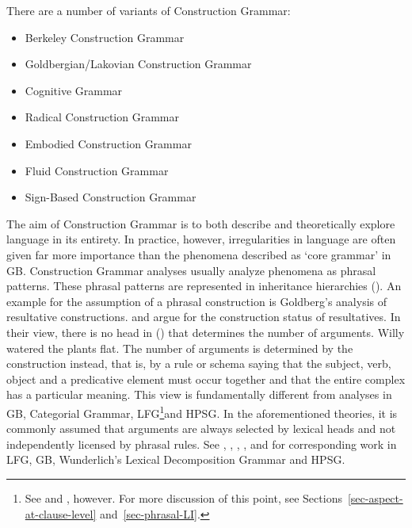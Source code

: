 There are a number of variants of Construction Grammar:
\begin{sloppypar}
\begin{itemize}
\item Berkeley Construction Grammar \citep{Fillmore88a,KF99a,FriedHSK}
\item Goldbergian/Lakovian Construction Grammar \citep{Lakoff87a-u,Goldberg95a,Goldberg2006a}
\item Cognitive Grammar \citep{Langacker87a-u,Langacker2000a,Langacker2008a-u,Dabrowska2004a}
\item Radical Construction Grammar \citep{Croft2001a}
\item Embodied Construction Grammar \citep{BC2005a}
\item Fluid Construction Grammar \citep{SDB2006a-u,SteelsFluid-ed-not-crossreferenced}
\item Sign-Based Construction Grammar \citep{Sag2010b,Sag2012a}
\end{itemize}
\end{sloppypar}

\noindent
The aim of Construction Grammar is to both describe and theoretically explore language in its entirety.
In practice, however, irregularities in language are often given far more importance than the phenomena described
as `core grammar' in GB. Construction Grammar analyses usually analyze phenomena as phrasal patterns.
These phrasal patterns are represented in inheritance hierarchies (\eg \citealp{Croft2001a,Goldberg2003a}).
%
An example for the assumption of a phrasal construction is Goldberg's analysis of resultative constructions.
\citet{Goldberg95a} and \citet{GJ2004a} argue for the construction status of resultatives. In their view, there is no head
in () that determines the number of arguments.
\ea
Willy watered the plants flat.
\z
The number of arguments is determined by the construction instead, that is, by a rule or schema saying that the subject, verb, object and a predicative
element must occur together and that the entire complex has a particular meaning. This view is fundamentally different from analyses in GB\indexgb,
Categorial Grammar\indexcg, LFG\footnote{%
	See  and , however. For more discussion of this point, see
        Sections~\ref{sec-aspect-at-clause-level} and~\ref{sec-phrasal-LI}.%
}\indexlfg and HPSG\indexhpsg.
In the aforementioned theories, it is commonly assumed that arguments are always selected by lexical heads and not independently licensed by phrasal
rules. See , , , , and
 for corresponding work in LFG, GB, Wunderlich's
Lexical Decomposition Grammar and HPSG. 

